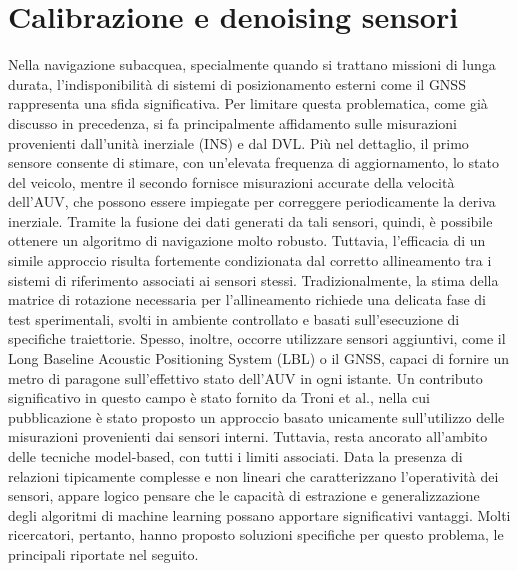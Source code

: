 

\section{Calibrazione e denoising sensori}

Nella navigazione subacquea, specialmente quando si trattano missioni di lunga durata, l'indisponibilità di sistemi di posizionamento esterni come il GNSS rappresenta una sfida significativa. Per limitare questa problematica, come già discusso in precedenza, si fa principalmente affidamento sulle misurazioni provenienti dall'unità inerziale (INS) e dal DVL. Più nel dettaglio, il primo sensore consente di stimare, con un'elevata frequenza di aggiornamento, lo stato del veicolo, mentre il secondo fornisce misurazioni accurate della velocità dell'AUV, che possono essere impiegate per correggere periodicamente la deriva inerziale. Tramite la fusione dei dati generati da tali sensori, quindi, è possibile ottenere un algoritmo di navigazione molto robusto. Tuttavia, l'efficacia di un simile approccio risulta fortemente condizionata dal corretto allineamento tra i sistemi di riferimento associati ai sensori stessi. Tradizionalmente, la stima della matrice di rotazione necessaria per l'allineamento richiede una delicata fase di test sperimentali,  svolti in ambiente controllato e basati sull'esecuzione di specifiche traiettorie. Spesso, inoltre, occorre utilizzare sensori aggiuntivi, come il Long Baseline Acoustic Positioning System (LBL) o il GNSS, capaci di fornire un metro di paragone sull'effettivo stato dell'AUV in ogni istante. Un contributo significativo in questo campo è stato fornito da Troni et al.\cite{Troni}, nella cui pubblicazione è stato proposto un approccio basato unicamente sull'utilizzo delle misurazioni provenienti dai sensori interni. Tuttavia, resta ancorato all'ambito delle tecniche model-based, con tutti i limiti associati. Data la presenza di relazioni tipicamente complesse e non lineari che caratterizzano l'operatività dei sensori, appare logico pensare che le capacità di estrazione e generalizzazione degli algoritmi di machine learning possano apportare significativi vantaggi. Molti ricercatori, pertanto, hanno proposto soluzioni specifiche per questo problema, le principali riportate nel seguito.

